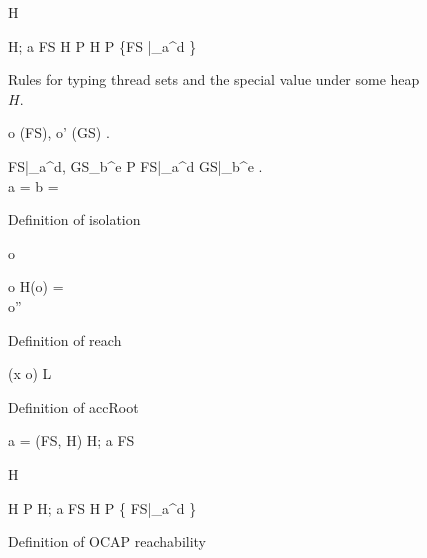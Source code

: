 \begin{figure}
  {H \vdash \emptyset}

  \RuleSpace{}

  { H; a \vdash FS \andalso H \vdash P }
  { H \vdash P \cup \left\{FS |_a^d \right\} }

  \caption{Rules for typing thread sets and the special value \Error{} under some heap $H$.}
  \label{fig:ts_typing}
\end{figure}

\begin{figure}
  { 
    \forall o \in \accRoots(FS), o' \in \accRoots(GS) . \: 
  }
  {
  }
  
  \RuleSpace{}

  {
    \forall FS|_a^d, GS_b^e \in P  FS|_a^d \neq GS|_b^e . \\
    a = \ocap \: \lor \: b = \ocap \implies {}
  }
  {
  }
  \caption{Definition of isolation}
  \label{fig:def_isolation}
\end{figure}

\begin{figure}
  {o \in {}}
  {}

  \RuleSpace{}

  {
    o \in {} \andalso H(o) =  \\
    o'' \in {} \andalso {}
  }
  {  }
  \caption{Definition of reach}
  \label{fig:def_reach}
\end{figure}

\begin{figure}
  { (x \mapsto o) \in L }
  {  }

  \RuleSpace{}

  {  \: \lor \:  }
  {  }
  \caption{Definition of accRoot}
  \label{fig:def_accroot}
\end{figure}

\begin{figure}
  { a = \ocap \implies \ocrloc(FS, H) }
  { H; a \vdash FS \tsep \ocr }

  \RuleSpace{}

  {H \vdash \emptyset \tsep \ocr}

  \RuleSpace{}

  {H \vdash P \tsep \ocr \andalso H; a \vdash FS \tsep \ocr}
  {H \vdash P \cup \left\{ FS|_a^d \right\} \tsep \ocr}

  \caption{Definition of OCAP reachability}
  \label{fig:def_ocapreach}
\end{figure}

